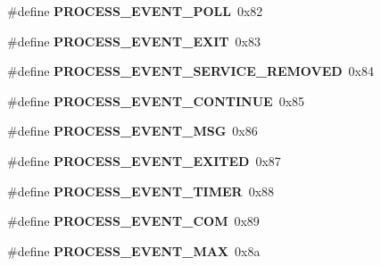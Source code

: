 \begin{DoxyCompactItemize}
\item 
\hypertarget{group__process_gaa651f4990d6044e87d5ded0762ef5fec}{\#define {\bfseries P\-R\-O\-C\-E\-S\-S\-\_\-\-E\-V\-E\-N\-T\-\_\-\-P\-O\-L\-L}~0x82}\label{group__process_gaa651f4990d6044e87d5ded0762ef5fec}

\item 
\hypertarget{group__process_ga05a3f7ccdd1fa76a632233b2fb925030}{\#define {\bfseries P\-R\-O\-C\-E\-S\-S\-\_\-\-E\-V\-E\-N\-T\-\_\-\-E\-X\-I\-T}~0x83}\label{group__process_ga05a3f7ccdd1fa76a632233b2fb925030}

\item 
\hypertarget{group__process_ga2ad52142e294647c7a6f4d3b1f7d0c50}{\#define {\bfseries P\-R\-O\-C\-E\-S\-S\-\_\-\-E\-V\-E\-N\-T\-\_\-\-S\-E\-R\-V\-I\-C\-E\-\_\-\-R\-E\-M\-O\-V\-E\-D}~0x84}\label{group__process_ga2ad52142e294647c7a6f4d3b1f7d0c50}

\item 
\hypertarget{group__process_gacdefdad965091a7d73b81b4b79d20cf3}{\#define {\bfseries P\-R\-O\-C\-E\-S\-S\-\_\-\-E\-V\-E\-N\-T\-\_\-\-C\-O\-N\-T\-I\-N\-U\-E}~0x85}\label{group__process_gacdefdad965091a7d73b81b4b79d20cf3}

\item 
\hypertarget{group__process_gaf9468ac9433d3fefdc38e1c49c290a45}{\#define {\bfseries P\-R\-O\-C\-E\-S\-S\-\_\-\-E\-V\-E\-N\-T\-\_\-\-M\-S\-G}~0x86}\label{group__process_gaf9468ac9433d3fefdc38e1c49c290a45}

\item 
\hypertarget{group__process_ga1b2dcad893494c2a0c51bc18ef53c854}{\#define {\bfseries P\-R\-O\-C\-E\-S\-S\-\_\-\-E\-V\-E\-N\-T\-\_\-\-E\-X\-I\-T\-E\-D}~0x87}\label{group__process_ga1b2dcad893494c2a0c51bc18ef53c854}

\item 
\hypertarget{group__process_gad5863f65171a4a63e598afc3da030290}{\#define {\bfseries P\-R\-O\-C\-E\-S\-S\-\_\-\-E\-V\-E\-N\-T\-\_\-\-T\-I\-M\-E\-R}~0x88}\label{group__process_gad5863f65171a4a63e598afc3da030290}

\item 
\hypertarget{group__process_gaedffb0684c685580b478e8f49eabc3ad}{\#define {\bfseries P\-R\-O\-C\-E\-S\-S\-\_\-\-E\-V\-E\-N\-T\-\_\-\-C\-O\-M}~0x89}\label{group__process_gaedffb0684c685580b478e8f49eabc3ad}

\item 
\hypertarget{group__process_gaf4acd471e64f0b2209049ee42ccff3e4}{\#define {\bfseries P\-R\-O\-C\-E\-S\-S\-\_\-\-E\-V\-E\-N\-T\-\_\-\-M\-A\-X}~0x8a}\label{group__process_gaf4acd471e64f0b2209049ee42ccff3e4}


\end{DoxyCompactItemize}
